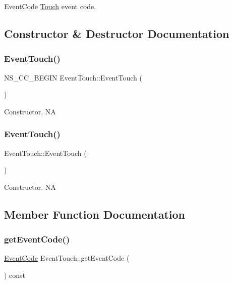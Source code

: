 Event\+Code \hyperlink{classTouch}{Touch} event code. 

\subsection{Constructor \& Destructor Documentation}
\mbox{\label{classEventTouch_aeb38249006126c7dc9403df2f4dbf53f}} 
\subsubsection{\texorpdfstring{Event\+Touch()}{EventTouch()}\hspace{0.1cm}{\footnotesize\ttfamily [1/2]}}
{\footnotesize\ttfamily N\+S\+\_\+\+C\+C\+\_\+\+B\+E\+G\+IN Event\+Touch\+::\+Event\+Touch (\begin{DoxyParamCaption}{ }\end{DoxyParamCaption})}

Constructor.  NA \mbox{\label{classEventTouch_a10238760094be14269a0e166c35c3112}} 
\subsubsection{\texorpdfstring{Event\+Touch()}{EventTouch()}\hspace{0.1cm}{\footnotesize\ttfamily [2/2]}}
{\footnotesize\ttfamily Event\+Touch\+::\+Event\+Touch (\begin{DoxyParamCaption}{ }\end{DoxyParamCaption})}

Constructor.  NA 

\subsection{Member Function Documentation}
\mbox{\label{classEventTouch_acd18ac36408f6789e079dde77b7c8240}} 
\subsubsection{\texorpdfstring{get\+Event\+Code()}{getEventCode()}\hspace{0.1cm}{\footnotesize\ttfamily [1/2]}}
{\footnotesize\ttfamily \hyperlink{classEventTouch_a35816ad7349f0b7accc0a30a469b0087}{Event\+Code} Event\+Touch\+::get\+Event\+Code (\begin{DoxyParamCaption}{ }\end{DoxyParamCaption}) const\hspace{0.3cm}{\ttfamily [inline]}}

